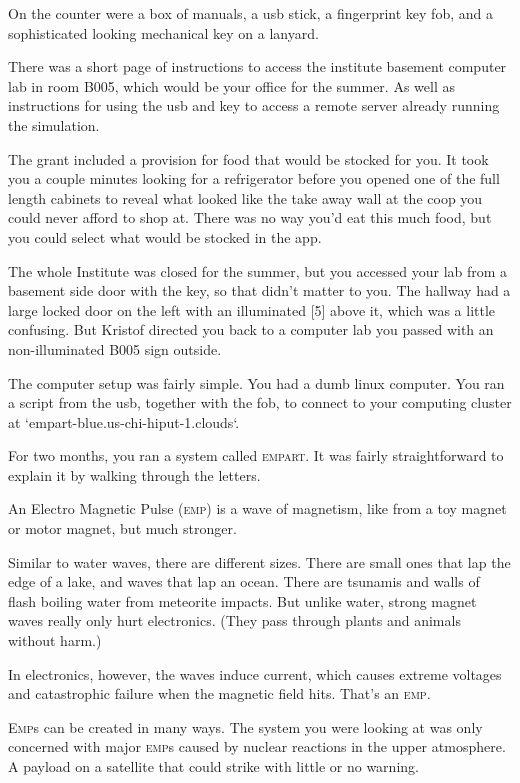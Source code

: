 \documentclass[a5paper, symmetric]{tufte-book}
\begin{document}
On the counter were a box of manuals, a usb stick, a fingerprint key fob, and a sophisticated looking mechanical key on a lanyard. 

There was a short page of instructions to access the institute basement computer lab in room B005, which would be your office for the summer. As well as instructions for using the usb and key to access a remote server already running the simulation. 

The grant included a provision for food that would be stocked for you. It took you a couple minutes looking for a refrigerator before you opened one of the full length cabinets to reveal what looked like the take away wall at the coop you could never afford to shop at. There was no way you'd eat this much food, but you could select what would be stocked in the app. 

The whole Institute was closed for the summer, but you accessed your lab from a basement side door with the key, so that didn't matter to you. The hallway had a large locked door on the left with an illuminated [5] above it, which was a little confusing. But Kristof directed you back to a computer lab you passed with an non-illuminated B005 sign outside. 

The computer setup was fairly simple. You had a dumb linux computer. You ran a script from the usb, together with the fob, to connect to your computing cluster at `empart-blue.us-chi-hiput-1.clouds`. 

For two months, you ran a system called \textsc{empart}. It was fairly straightforward to explain it by walking through the letters.

An Electro Magnetic Pulse (\textsc{emp}) is a wave of magnetism, like from a toy magnet or motor magnet, but much stronger. 

Similar to water waves, there are different sizes. There are small ones that lap the edge of a lake, and waves that lap an ocean. There are tsunamis and walls of flash boiling water from meteorite impacts. But unlike water, strong magnet waves really only hurt electronics. (They pass through plants and animals without harm.) 

In electronics, however, the waves induce current, which causes extreme voltages and catastrophic failure when the magnetic field hits. That's an \textsc{emp}. 

\textsc{Emp}s can be created in many ways. The system you were looking at was only concerned with major \textsc{emp}s caused by nuclear reactions in the upper atmosphere. A payload on a satellite that could strike with little or no warning.
\end{document}
